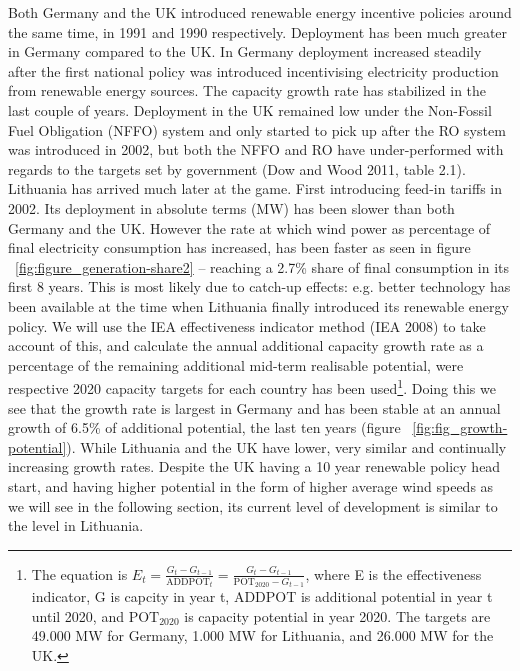 \documentclass[a4paper, 12pt]{article}
\begin{document}


Both Germany and the UK introduced renewable energy incentive policies around the same time, in 1991 and 1990 respectively. Deployment has been much greater in Germany compared to the UK. In Germany deployment increased steadily after the first national policy was introduced incentivising electricity production from renewable energy sources. The capacity growth rate has stabilized in the last couple of years. Deployment in the UK remained low under the Non-Fossil Fuel Obligation (NFFO) system and only started to pick up after the RO system was introduced in 2002, but both the NFFO and RO have under-performed with regards to the targets set by government (Dow and Wood 2011, table 2.1). Lithuania has arrived much later at the game. First introducing feed-in tariffs in 2002. Its deployment in absolute terms (MW) has been slower than both Germany and the UK. However the rate at which wind power as percentage of final electricity consumption has increased, has been faster as seen in figure ~\ref{fig:figure_generation-share2} – reaching a 2.7\% share of final consumption in its first 8 years. This is most likely due to catch-up effects: e.g. better technology has been available at the time when Lithuania finally introduced its renewable energy policy. We will use the IEA effectiveness indicator method (IEA 2008) to take account of this, and calculate the annual additional capacity growth rate as a percentage of the remaining additional mid-term realisable potential, were respective 2020 capacity targets for each country has been used\footnote{The equation is $E_t = \frac{G_t - G_{t-1}}{\text{ADDPOT}_t} = \frac{G_t - G_{t-1}}{\text{POT}_{2020} - G_{t-1}}$, where E is the effectiveness indicator, G is capcity in year t, ADDPOT is additional potential in year t until 2020, and $\text{POT}_{2020}$ is capacity potential in year 2020. The targets are 49.000 MW for Germany, 1.000 MW for Lithuania, and 26.000 MW for the UK.}.  Doing this we see that the growth rate is largest in Germany and has been stable at an annual growth of 6.5\% of additional potential, the last ten years (figure ~\ref{fig:fig_growth-potential}). While Lithuania and the UK have lower, very similar and continually increasing growth rates. Despite the UK having a 10 year renewable policy head start, and having higher potential in the form of higher average wind speeds as we will see in the following section, its current level of development is similar to the level in Lithuania.
\end{document}
